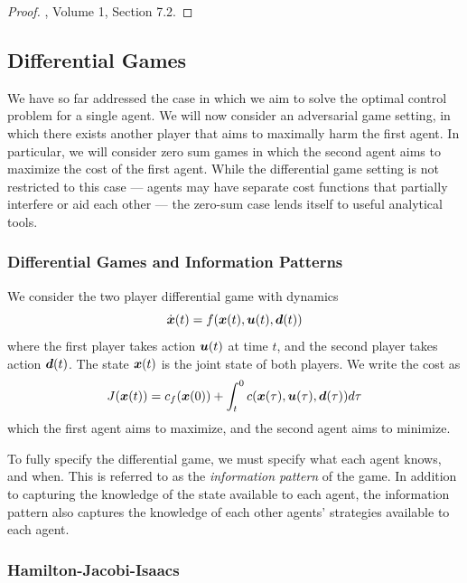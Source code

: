 \begin{proof}
\cite{bertsekas1995dynamic}, Volume 1, Section 7.2.
\end{proof}


\subsection{Differential Games}

We have so far addressed the case in which we aim to solve the optimal control problem for a single agent. We will now consider an adversarial game setting, in which there exists another player that aims to maximally harm the first agent. In particular, we will consider zero sum games in which the second agent aims to maximize the cost of the first agent. While the differential game setting is not restricted to this case --- agents may have separate cost functions that partially interfere or aid each other --- the zero-sum case lends itself to useful analytical tools. 

\subsubsection{Differential Games and Information Patterns}

We consider the two player differential game with dynamics
\begin{equation}
    \dot{\bm{x}}(t) = f(\bm{x}(t),\bm{u}(t),\bm{d}(t))
\end{equation}
where the first player takes action $\bm{u}(t)$ at time $t$, and the second player takes action $\bm{d}(t)$. The state $\bm{x}(t)$ is the joint state of both players. We write the cost as 
\begin{equation}
    J(\bm{x}(t)) = c_f(\bm{x}(0)) + \int_{t}^{0} c(\bm{x}(\tau),\bm{u}(\tau),\bm{d}(\tau)) d\tau
\end{equation}
which the first agent aims to maximize, and the second agent aims to minimize. 

To fully specify the differential game, we must specify what each agent knows, and when. This is referred to as the \textit{information pattern} of the game. In addition to capturing the knowledge of the state available to each agent, the information pattern also captures the knowledge of each other agents' strategies available to each agent. 


\subsubsection{Hamilton-Jacobi-Isaacs}

